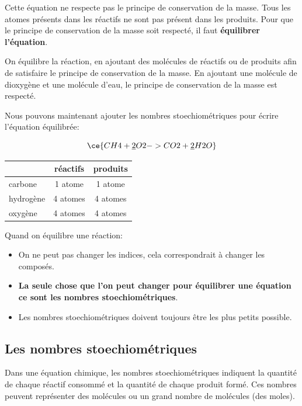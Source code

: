 \documentclass[
  11pt,
  a4paper,
  openany]{book}
\providecommand{\tightlist}{%
  \setlength{\itemsep}{0pt}\setlength{\parskip}{0pt}}
\begin{document}
Cette équation ne respecte pas le principe de conservation de la masse. Tous les atomes présents dans les réactifs ne sont pas présent dans les produits. Pour que le principe de conservation de la masse soit respecté, il faut \textbf{équilibrer l'équation}.

On équilibre la réaction, en ajoutant des molécules de réactifs ou de produits afin de satisfaire le principe de conservation de la masse. En ajoutant une molécule de dioxygène et une molécule d'eau, le principe de conservation de la masse est respecté.

Nous pouvons maintenant ajouter les nombres stoechiométriques pour écrire l'équation équilibrée:

\[ \ce{CH4 + \underline{2} O2 -> CO2 + \underline{2} H2O} \]

\begin{longtable}[]{@{}lcc@{}}
\toprule\noalign{}
& réactifs & produits \\
\midrule\noalign{}
\endhead
\bottomrule\noalign{}
\endlastfoot
carbone & 1 atome & 1 atome \\
hydrogène & 4 atomes & 4 atomes \\
oxygène & 4 atomes & 4 atomes \\
\end{longtable}

Quand on équilibre une réaction:

\begin{itemize}
\tightlist
\item
  On ne peut pas changer les indices, cela correspondrait à changer les composés.
\item
  \textbf{La seule chose que l'on peut changer pour équilibrer une équation ce sont les nombres stoechiométriques}.
\item
  Les nombres stoechiométriques doivent toujours être les plus petits possible.
\end{itemize}

\subsection{Les nombres stoechiométriques}\label{les-nombres-stoechiomuxe9triques}

Dans une équation chimique, les nombres stoechiométriques indiquent la quantité de chaque réactif consommé et la quantité de chaque produit formé. Ces nombres peuvent représenter des molécules ou un grand nombre de molécules (des moles).
\end{document}
